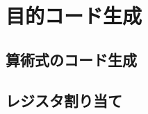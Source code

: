 \documentclass[dvipdfmx,a4j]{jbook}
\begin{document}
\chapter{目的コード生成}
\section{算術式のコード生成}
\section{レジスタ割り当て}
\end{document}

